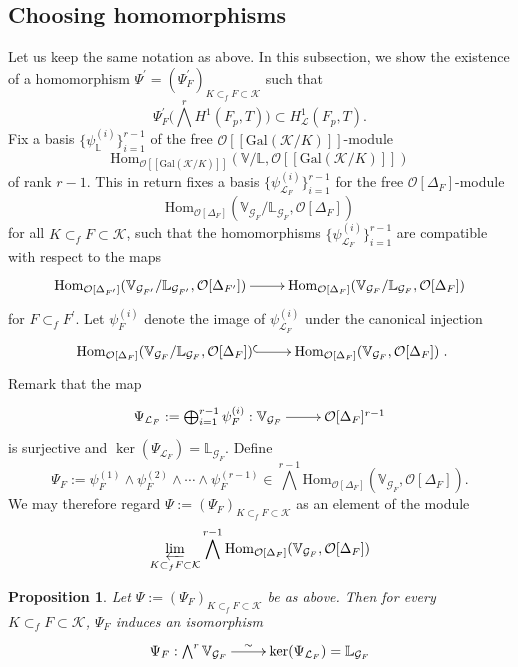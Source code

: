 \documentclass[reqno]{amsart}
\newcounter{dummy} \numberwithin{dummy}{section}
\newtheorem{pro}[dummy]{Proposition}
\begin{document}
\subsection{\bf Choosing homomorphisms} Let us keep the same notation as above. In this subsection, we show
the existence of a homomorphism
$\Psi^{\prime}=(\Psi^{\prime}_{F})_{K\subset_{f}F\subset
\mathcal{K}}$ such that
$$\Psi^{\prime}_{F}\big(\bigwedge^{r}H^{1}(F_{p},T)\big)\subset
H^{1}_{\mathcal{L}}(F_{p},T).$$ Fix a basis
$\{\psi_{\mathbb{L}}^{(i)}\}_{i=1}^{r-1}$ of the free
$\mathcal{O}[[\mathrm{Gal}(\mathcal{K}/K)]]$-module $$
\mathrm{Hom}_{\mathcal{O}[[\mathrm{Gal}(\mathcal{K}/K)]]}(\mathbb{V}/\mathbb{L},\mathcal{O}[[\mathrm{Gal}(\mathcal{K}/K)]])
$$ of rank $r-1$. This in return fixes a basis
$\{\psi_{\mathcal{L}_{F}}^{(i)}\}_{i=1}^{r-1}$ for the free
$\mathcal{O}[\Delta_{F}]$-module
$$
\mathrm{Hom}_{\mathcal{O}[\Delta_{F}]}(\mathbb{V}_{\mathcal{G}_{F}}/\mathbb{L}_{\mathcal{G}_{F}},
\mathcal{O}[\Delta_{F}])
$$
for all $K\subset_{f}F\subset \mathcal{K}$, such that the
homomorphisms $\{\psi_{\mathcal{L}_{F}}^{(i)}\}_{i=1}^{r-1}$ are
compatible with respect to the maps
$$
\xymatrix@=2pc{\mathrm{Hom}_{\mathcal{O}[\Delta_{F^{\prime}}]}
(\mathbb{V}_{\mathcal{G}_{F^{\prime}}}/\mathbb{L}_{\mathcal{G}_{F^{\prime}}},
\mathcal{O}[\Delta_{F^{\prime}}])\ar[r]&
\mathrm{Hom}_{\mathcal{O}[\Delta_{F}]}(\mathbb{V}_{\mathcal{G}_{F}}/\mathbb{L}_{\mathcal{G}_{F}},
\mathcal{O}[\Delta_{F}])}
$$
for $F\subset_{f}F^{\prime}$. Let $\psi_{F}^{(i)}$ denote the image
of $\psi_{\mathcal{L}_{F}}^{(i)}$ under the canonical injection
$$
\xymatrix@=2pc{
\mathrm{Hom}_{\mathcal{O}[\Delta_{F}]}(\mathbb{V}_{\mathcal{G}_{F}}/\mathbb{L}_{\mathcal{G}_{F}},
\mathcal{O}[\Delta_{F}])\ar@{^{(}->}[r]&\mathrm{Hom}_{\mathcal{O}[\Delta_{F}]}(\mathbb{V}_{\mathcal{G}_{F}},
\mathcal{O}[\Delta_{F}])}.
$$
Remark that the map
$$
\xymatrix@=2pc{\Psi_{\mathcal{L}_{F}}:=\bigoplus_{i=1}^{r-1}\psi_{F}^{(i)}:
\mathbb{V}_{\mathcal{G}_{F}}\ar[r]& \mathcal{O}[\Delta_{F}]^{r-1}}
$$
is surjective and
$\ker(\Psi_{\mathcal{L}_{F}})=\mathbb{L}_{\mathcal{G}_{F}}$. \vskip
6pt Define
$$
\Psi_{F}:=\psi_{F}^{(1)}\wedge \psi_{F}^{(2)}\wedge\cdots\wedge
\psi_{F}^{(r-1)}\in
\bigwedge^{r-1}\mathrm{Hom}_{\mathcal{O}[\Delta_{F}]}(\mathbb{V}_{\mathcal{G}_{F}},\mathcal{O}[\Delta_{F}]).
$$
We may therefore regard $\Psi:=(\Psi_{F})_{K\subset_{f}F\subset
\mathcal{K}}$ as an element of the module
$$
\varprojlim_{K\subset_{f}F\subset
\mathcal{K}}\bigwedge^{r-1}\mathrm{Hom}_{\mathcal{O}[\Delta_{F}]}(\mathbb{V}_{\mathcal{G}_{F}},\mathcal{O}[\Delta_{F}])
$$
\begin{pro}\label{pro Psi and coinvariant}
Let $\Psi:=(\Psi_{F})_{K\subset_{f}F\subset \mathcal{K}}$ be as
above. Then for every $K\subset_{f}F\subset \mathcal{K}$, $\Psi_{F}$
induces an isomorphism
$$
\xymatrix@=2pc{ \Psi_{F}:
\bigwedge^{r}\mathbb{V}_{\mathcal{G}_{F}}\ar[r]^-{\sim}&
\ker(\Psi_{\mathcal{L}_{F}})=\mathbb{L}_{\mathcal{G}_{F}}}
$$
\end{pro}
\end{document}
